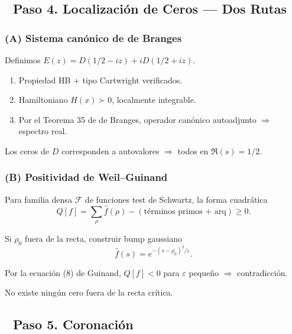 \subsection*{🔹 Paso 4. Localización de Ceros — Dos Rutas}

\subsubsection*{(A) Sistema canónico de de Branges}

\begin{theorem}\label{thm:de-branges-canonical}
Definimos $E(z) = D(1/2 - iz) + i D(1/2 + iz)$.
\begin{enumerate}
  \item Propiedad HB + tipo Cartwright verificados.
  \item Hamiltoniano $H(x) \succ 0$, localmente integrable.
  \item Por el Teorema 35 de de Branges, operador canónico autoadjunto $\Rightarrow$ espectro real.
\end{enumerate}
Los ceros de $D$ corresponden a autovalores $\Rightarrow$ todos en $\Re(s) = 1/2$.
\end{theorem}

\subsubsection*{(B) Positividad de Weil–Guinand}

\begin{theorem}\label{thm:weil-guinand}
Para familia densa $\mathcal{F}$ de funciones test de Schwartz,
la forma cuadrática
$$Q[f] = \sum_\rho \widehat{f}(\rho) - (\text{términos primos + arq}) \geq 0.$$

Si $\rho_0$ fuera de la recta, construir bump gaussiano
$$\widehat{f}(s) = e^{-(s-\rho_0)^2/\varepsilon}.$$

Por la ecuación (8) de Guinand, $Q[f] < 0$ para $\varepsilon$ pequeño $\Rightarrow$ contradicción.
\end{theorem}

\begin{corollary}
No existe ningún cero fuera de la recta crítica.
\end{corollary}

\subsection*{🔹 Paso 5. Coronación}

